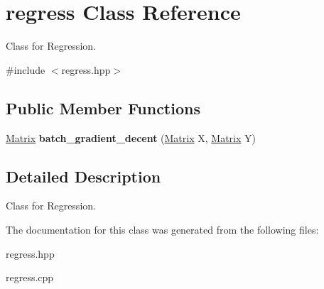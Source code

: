\hypertarget{classregress}{\section{regress Class Reference}
\label{classregress}
}


Class for Regression.  




{\ttfamily \#include $<$regress.\-hpp$>$}

\subsection*{Public Member Functions}
\begin{DoxyCompactItemize}
\item 
\hypertarget{classregress_aafbcdf5b615cc6305bc7e5368f95f894}{\hyperlink{classMatrix}{Matrix} {\bfseries batch\-\_\-gradient\-\_\-decent} (\hyperlink{classMatrix}{Matrix} X, \hyperlink{classMatrix}{Matrix} Y)}\label{classregress_aafbcdf5b615cc6305bc7e5368f95f894}

\end{DoxyCompactItemize}


\subsection{Detailed Description}
Class for Regression. 

The documentation for this class was generated from the following files\-:\begin{DoxyCompactItemize}
\item 
regress.\-hpp\item 
regress.\-cpp\end{DoxyCompactItemize}

